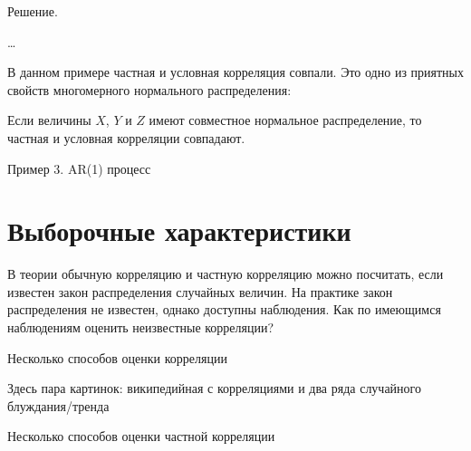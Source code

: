 \documentclass[10pt]{article}
\begin{document}
Решение.

\ldots

В данном примере частная и условная корреляция совпали. Это одно из приятных свойств многомерного нормального распределения: 


\begin{theorem}
Если величины $X$, $Y$ и $Z$ имеют совместное нормальное распределение, то частная и условная корреляции совпадают.
\end{theorem}

Пример 3. AR(1) процесс


\section{Выборочные характеристики}

В теории обычную корреляцию и частную корреляцию можно посчитать, если известен закон распределения случайных величин. На практике закон распределения не известен, однако доступны наблюдения. Как по имеющимся наблюдениям оценить неизвестные корреляции?


Несколько способов оценки корреляции


Здесь пара картинок: википедийная с корреляциями и два ряда случайного блуждания/тренда



Несколько способов оценки частной корреляции
\end{document}
